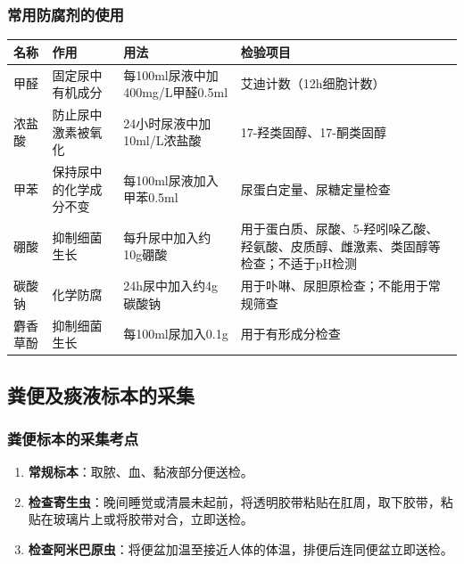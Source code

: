 \documentclass[11pt, a4paper]{ctexart}
\begin{document}
\subsubsection{常用防腐剂的使用}
\begin{table}[htbp]
	\centering
	\renewcommand{\arraystretch}{1.4} %
	\begin{tabularx}{\textwidth}{lXXX}
		\toprule
		\textbf{名称} & \textbf{作用} & \textbf{用法}              & \textbf{检验项目}                               \\
		\midrule
		甲醛          & 固定尿中有机成分    & 每100ml尿液中加400mg/L甲醛0.5ml & 艾迪计数（12h细胞计数）                               \\
		\addlinespace %
		浓盐酸         & 防止尿中激素被氧化   & 24小时尿液中加10ml/L浓盐酸        & 17-羟类固醇、17-酮类固醇                             \\
		\addlinespace
		甲苯          & 保持尿中的化学成分不变 & 每100ml尿液加入甲苯0.5ml        & 尿蛋白定量、尿糖定量检查                                \\
		\addlinespace
		硼酸          & 抑制细菌生长      & 每升尿中加入约10g硼酸             & 用于蛋白质、尿酸、5-羟吲哚乙酸、羟氨酸、皮质醇、雌激素、类固醇等检查；不适于pH检测 \\
		\addlinespace
		碳酸钠         & 化学防腐        & 24h尿中加入约4g碳酸钠            & 用于卟啉、尿胆原检查；不能用于常规筛查                         \\
		\addlinespace
		麝香草酚        & 抑制细菌生长      & 每100ml尿加入0.1g            & 用于有形成分检查                                    \\
		\bottomrule
	\end{tabularx}
\end{table}

\subsection{粪便及痰液标本的采集}
\subsubsection{粪便标本的采集考点}
\begin{enumerate}
	\item \textbf{常规标本}：取脓、血、黏液部分便送检。
	\item \textbf{检查寄生虫}：晚间睡觉或清晨未起前，将透明胶带粘贴在肛周，取下胶带，粘贴在玻璃片上或将胶带对合，立即送检。
	\item \textbf{检查阿米巴原虫}：将便盆加温至接近人体的体温，排便后连同便盆立即送检。
\end{enumerate}
\end{document}
